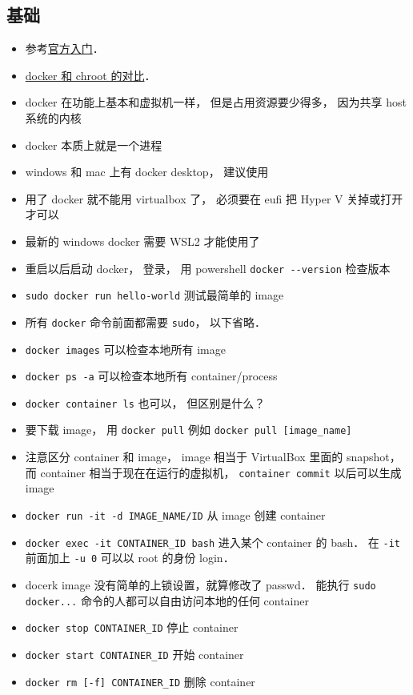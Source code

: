 \subsection{基础}
\begin{itemize}
\item 参考\href{https://docs.docker.com/get-started/}{官方入门}．
\item \href{https://devops.stackexchange.com/questions/2826/difference-between-chroot-and-docker}{docker 和 chroot 的对比}．
\item docker 在功能上基本和虚拟机一样， 但是占用资源要少得多， 因为共享 host 系统的内核
\item docker 本质上就是一个进程
\item windows 和 mac 上有 docker desktop， 建议使用
\item 用了 docker 就不能用 virtualbox 了， 必须要在 eufi 把 Hyper V 关掉或打开才可以
\item 最新的 windows docker 需要 WSL2 才能使用了
\item 重启以后启动 docker， 登录， 用 powershell \verb`docker --version` 检查版本
\item \verb`sudo docker run hello-world` 测试最简单的 image
\item 所有 \verb|docker| 命令前面都需要 \verb|sudo|， 以下省略．
\item \verb`docker images` 可以检查本地所有 image
\item \verb`docker ps -a` 可以检查本地所有 container/process
\item \verb|docker container ls| 也可以， 但区别是什么？
\item 要下载 image， 用 \verb`docker pull` 例如 \verb`docker pull [image_name]`
\item 注意区分 container 和 image， image 相当于 VirtualBox 里面的 snapshot， 而 container 相当于现在在运行的虚拟机， \verb`container commit` 以后可以生成 image
\item \verb`docker run -it -d IMAGE_NAME/ID` 从 image 创建 container
\item \verb`docker exec -it CONTAINER_ID bash` 进入某个 container 的 bash． 在 \verb|-it| 前面加上 \verb|-u 0| 可以以 root 的身份 login．
\item docerk image 没有简单的上锁设置，就算修改了 passwd． 能执行 \verb`sudo docker...` 命令的人都可以自由访问本地的任何 container
\item \verb`docker stop CONTAINER_ID` 停止 container
\item \verb`docker start CONTAINER_ID` 开始 container
\item \verb`docker rm [-f] CONTAINER_ID` 删除 container

\end{itemize}
